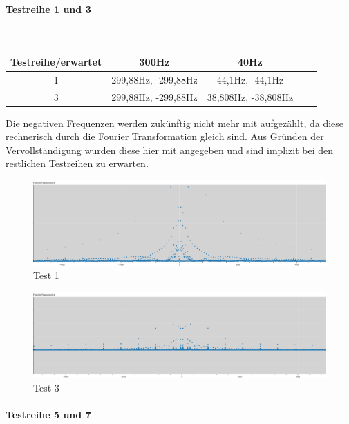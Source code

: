 \paragraph{Testreihe 1 und 3}
-
\begin{table}[h!]
	\centering
	\begin{tabular}{|c | c | c | c | c |}		
		\hline
		Testreihe/erwartet & 300Hz & 40Hz \\
		\hline\hline
		1		&	299,88Hz, -299,88Hz & 44,1Hz, -44,1Hz \\
		3		&	299,88Hz, -299,88Hz  &	38,808Hz, -38,808Hz	\\
		\hline	
	\end{tabular}	
\end{table}

Die negativen Frequenzen werden zukünftig nicht mehr mit aufgezählt, da diese rechnerisch durch die Fourier Transformation gleich sind. Aus Gründen der Vervollständigung wurden diese hier mit angegeben und sind implizit bei den restlichen Testreihen zu erwarten.

\begin{figure}[h!]
	\centering      
	\includegraphics[scale=0.34]{results/test1.png}
	\caption{Test 1}
	\label{fig:test1}
\end{figure}

\begin{figure}[h!]
	\centering      
	\includegraphics[scale=0.34]{results/test3.png}
	\caption{Test 3}
	\label{fig:test3}
\end{figure}

\newpage

\paragraph{Testreihe 5 und 7}

